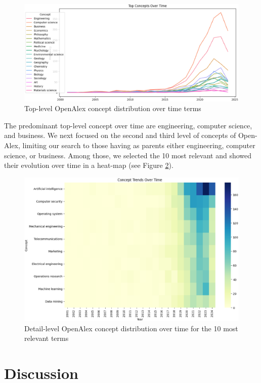 \documentclass[a4paper, review, endfloat, doubleblind, authoryear]{elsarticle}
\begin{document}
	\begin{figure}[htbp]
		\centering
		\includegraphics[width=\linewidth]{pics/main_concept_trend_toplevel.eps}
		\caption{Top-level OpenAlex concept distribution over time terms}\label{fig:fig13}
	\end{figure}
	
	The predominant top-level concept over time are engineering, computer science, and business. We next focused on the second and third level of concepts of Open-Alex, limiting our search to those having as parents either engineering, computer science, or business. Among those, we selected the 10 most relevant and showed their evolution over time in a heat-map (see Figure \ref{fig:fig14}).
	
	\begin{figure}[htbp]
		\centering
		\includegraphics[width=\linewidth]{pics/main_concept_trend_lowerlevels.eps}
		\caption{Detail-level OpenAlex concept distribution over time for the 10 most relevant terms}\label{fig:fig14}
	\end{figure}
	
	\section{Discussion}
	
\end{document}
